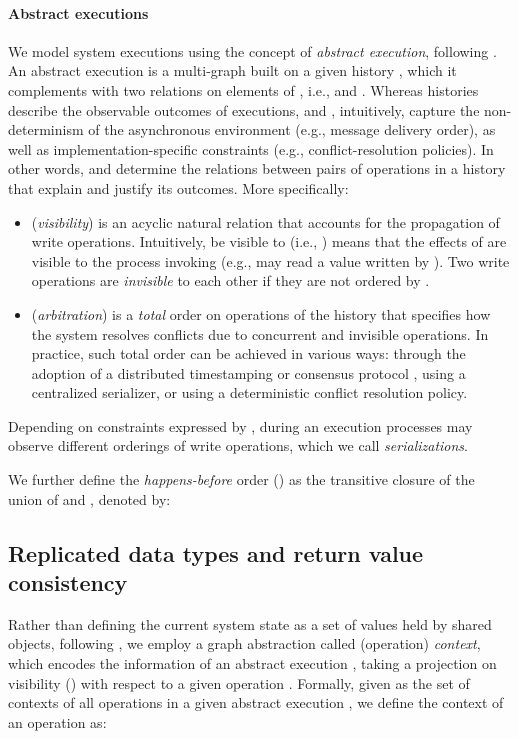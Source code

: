 \documentclass[letter, 11pt]{article}
\newcommand{\citeN}{\citet}
\renewcommand{\cite}{\citep}
\begin{document}
\paragraph{Abstract executions} We model system executions using the concept of 
\emph{abstract execution}, following \citeN{Burckhardt:14}. An abstract execution is a multi-graph  built on a given history , which it complements with two relations on elements of , i.e.,  and . Whereas histories describe the observable outcomes of executions,
 and , intuitively, capture the non-determinism of the asynchronous environment (e.g., message delivery order), as well as implementation-specific constraints (e.g., conflict-resolution policies).
In other words,  and  determine the relations between pairs of operations in a 
history that explain and justify its outcomes. 
More specifically:
\begin{itemize}
\item  (\emph{visibility}) is an acyclic natural relation that accounts for the propagation of write operations. 
Intuitively,  be visible to  (i.e., ) means that the effects of  are visible to the process invoking  (e.g.,  may read a value written by ). 
Two write operations are \emph{invisible} to each other if they are not ordered by .

\item  (\emph{arbitration}) is a \emph{total} order on operations of the history that specifies 
how  the system resolves conflicts due to concurrent and invisible operations. In practice, such total order can be achieved in various ways: through the 
adoption of a distributed timestamping \cite{Lamport:78} or consensus protocol \cite{Birman.ea:91,Hadzilacos.Toueg:94,Lamport:01}, 
using a centralized serializer, or 
using a deterministic conflict resolution policy.
\end{itemize}

Depending on constraints expressed by ,
during an execution processes may observe different orderings of write operations, which we call \emph{serializations}. 

We further define the \emph{happens-before} order () as the transitive closure 
of the union of  and , denoted by: 




\subsection{Replicated data types and return value consistency}
Rather than defining the current system state as a set of values held by shared objects,
following \citeN{Burckhardt:14},
we employ a graph abstraction called (operation) \emph{context}, which
encodes the information 
of an abstract execution , taking a projection on visibility () 
with respect to a given operation .
Formally, given  as the set of contexts of all operations in a given abstract execution , we define the context of an operation  as:
\end{document}
